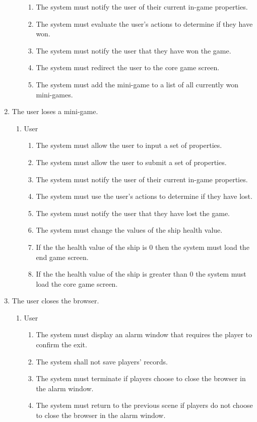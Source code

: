 \documentclass[]{article}
\begin{document}
\begin{enumerate}[{BE}1.]
\begin{enumerate}[{VP3}.1]
\begin{enumerate}
				\item The system must notify the user of their current in-game properties.
				\item The system must evaluate the user's actions to determine if they have won.
				\item The system must notify the user that they have won the game.
				\item The system must redirect the user to the core game screen.
				\item The system must add the mini-game to a list of all currently won mini-games.
			\end{enumerate}
	\end{enumerate}
	\item The user loses a mini-game.
	\begin{enumerate}[{VP4}.1]
		\item User
			\begin{enumerate}
				\item The system must allow the user to input a set of properties.
				\item The system must allow the user to submit a set of properties.
				\item The system must notify the user of their current in-game properties.
				\item The system must use the user's actions to determine if they have lost.
				\item The system must notify the user that they have lost the game.
				\item The system must change the values of the ship health value.
				\item If the the health value of the ship is 0 then the system must load the end game screen.
				\item If the the health value of the ship is greater than 0 the system must load the core game screen.
			\end{enumerate}
	\end{enumerate}
	\item The user closes the browser.
	\begin{enumerate}[{VP5}.1]
		\item User
			\begin{enumerate}
				\item The system must display an alarm window that requires the player to confirm the exit.
				\item The system shall not save players' records.
				\item The system must terminate if players choose to close the browser in the alarm window.
				\item The system must return to the previous scene if players do not choose to close the browser in the alarm window.
			\end{enumerate}
	\end{enumerate}
	
\end{enumerate}
\end{document}
